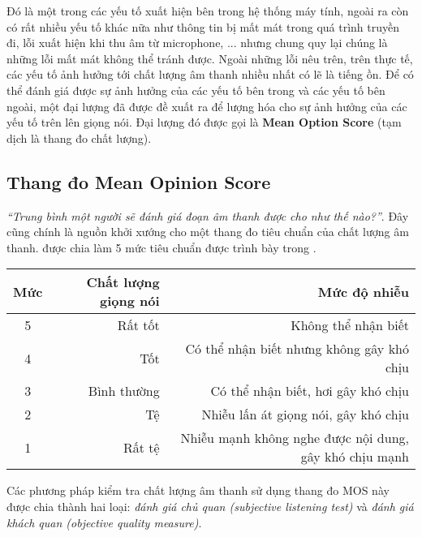 		Đó là một trong các yếu tố xuất hiện bên trong hệ thống máy tính, ngoài ra còn có rất nhiều yếu tố khác nữa như thông tin bị mất mát trong quá trình truyền đi, lỗi xuất hiện khi thu âm từ microphone, ... nhưng chung quy lại chúng là những lỗi mất mát không thể tránh được. Ngoài những lỗi nêu trên, trên thực tế, các yếu tố ảnh hưởng tới chất lượng âm thanh nhiều nhất có lẽ là tiếng ồn. Để có thể đánh giá được sự ảnh hưởng của các yếu tố bên trong và các yếu tố bên ngoài, một đại lượng đã được đề xuất ra để lượng hóa cho sự ảnh hưởng của các yếu tố trên lên giọng nói. Đại lượng đó được gọi là \textbf{Mean Option Score} (tạm dịch là thang đo chất lượng).
		
	\subsection{Thang đo Mean Opinion Score}
		
		\textit{``Trung bình một người sẽ đánh giá đoạn âm thanh được cho như thế nào?''}. Đây cũng chính là nguồn khởi xướng cho một thang đo tiêu chuẩn của chất lượng âm thanh.  \cite{mos} được chia làm 5 mức tiêu chuẩn được trình bày trong .
		
			\begin{table}[h]
				\centering
				\begin{tabular}{c r r}
					\hline
					\textbf{Mức}	& \textbf{Chất lượng giọng nói} & \textbf{Mức độ nhiễu} \\
					\hline
					5				& Rất tốt						& Không thể nhận biết \\
					4				& Tốt							& Có thể nhận biết nhưng không gây khó chịu \\
					3				& Bình thường					& Có thể nhận biết, hơi gây khó chịu \\
					2				& Tệ							& Nhiễu lấn át giọng nói, gây khó chịu \\
					1				& Rất tệ						& Nhiễu mạnh không nghe được nội dung, gây khó chịu mạnh \\
					\hline
				\end{tabular}
			\label{sound::mos_table}
			\end{table}
		
		Các phương pháp kiểm tra chất lượng âm thanh sử dụng thang đo MOS này được chia thành hai loại: \textit{đánh giá chủ quan (subjective listening test)} và \textit{đánh giá khách quan (objective quality measure)}. 
		
